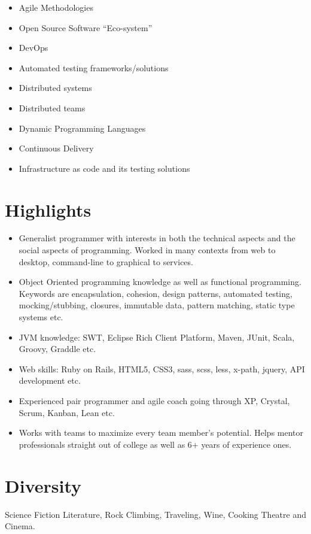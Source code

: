 \documentclass[letter,10pt]{article}
\begin{document}
\begin{itemize}
\item Agile Methodologies
\item Open Source Software ``Eco-system''
\item DevOps
\item Automated testing frameworks/solutions
\item Distributed systems
\item Distributed teams
\item Dynamic Programming Languages
\item Continuous Delivery
\item Infrastructure as code and its testing solutions
\end{itemize}

\section{Highlights}

\begin{itemize}
\item Generalist programmer with interests in both the technical
  aspects and the social aspects of programming. Worked in many contexts from web to desktop, command-line to graphical to services.
\item Object Oriented programming knowledge as well as functional programming. Keywords are encapsulation, cohesion, design patterns, automated testing, mocking/stubbing, closures, immutable data, pattern matching, static type systems etc.
\item JVM knowledge: SWT, Eclipse Rich Client Platform, Maven, JUnit, Scala, Groovy, Graddle etc.
\item Web skills: Ruby on Rails, HTML5, CSS3, sass, scss, less, x-path, jquery, API development etc.
\item Experienced pair programmer and agile coach going through XP, Crystal, Scrum, Kanban, Lean etc.
\item Works with teams to maximize every team member's potential. Helps mentor professionals straight out of college as well as 6+ years of experience ones.
\end{itemize}

\section{Diversity}

Science Fiction Literature, Rock Climbing, Traveling, Wine, Cooking
Theatre and Cinema.
\end{document}
